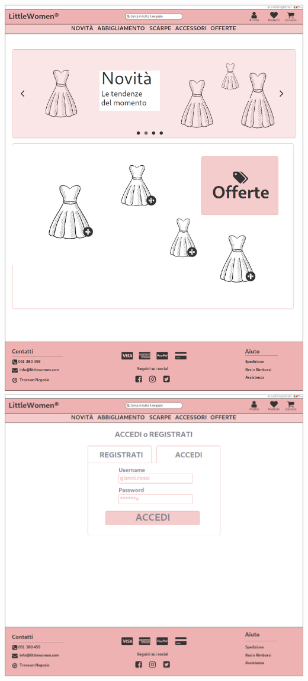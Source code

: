 \documentclass[12pt,a4paper]{report}
\begin{document}
\includegraphics[width=\textwidth]{"Project Management Sources/Wireframe/WireFrame Screenshot/Desktop/1 - Homepage"}
\includegraphics[width=\textwidth]{"Project Management Sources/Wireframe/WireFrame Screenshot/Desktop/2 - Accedi"}
\end{document}

